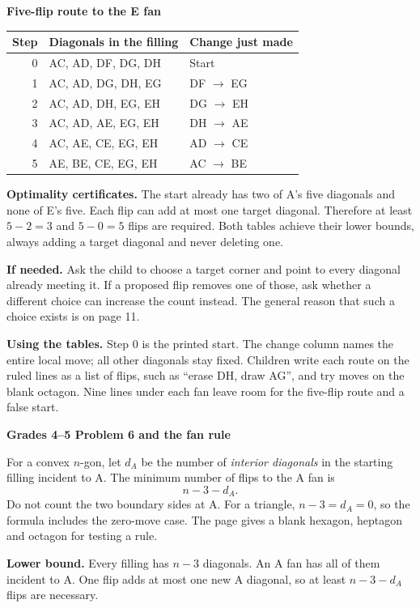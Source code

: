 \documentclass[11pt,letterpaper]{article}
\newcommand{\pagehead}[1]{{\Large\bfseries #1}\par\vspace{3pt}}
\newcommand{\prob}[2]{\par\vspace{5pt}{\large\bfseries #1}\par #2}
\newcommand{\hint}[1]{\par\textbf{If needed.} #1\par}
\begin{document}
\textbf{Five-flip route to the E fan}
\begin{center}\begin{tabular}{rll}\toprule Step & Diagonals in the filling & Change just made\\\midrule
0 & AC, AD, DF, DG, DH & Start\\
1 & AC, AD, DG, DH, EG & DF $\to$ EG\\
2 & AC, AD, DH, EG, EH & DG $\to$ EH\\
3 & AC, AD, AE, EG, EH & DH $\to$ AE\\
4 & AC, AE, CE, EG, EH & AD $\to$ CE\\
5 & AE, BE, CE, EG, EH & AC $\to$ BE\\
\bottomrule\end{tabular}\end{center}

\textbf{Optimality certificates.} The start already has two of A's five diagonals and none of E's five. Each flip can add at most one target diagonal. Therefore at least $5-2=3$ and $5-0=5$ flips are required. Both tables achieve their lower bounds, always adding a target diagonal and never deleting one.
\hint{Ask the child to choose a target corner and point to every diagonal already meeting it. If a proposed flip removes one of those, ask whether a different choice can increase the count instead. The general reason that such a choice exists is on page 11.}
\textbf{Using the tables.} Step 0 is the printed start. The change column names the entire local move; all other diagonals stay fixed. Children write each route on the ruled lines as a list of flips, such as ``erase DH, draw AG'', and try moves on the blank octagon. Nine lines under each fan leave room for the five-flip route and a false start.

\newpage
\pagehead{Grades 4--5 Problem 6 and the fan rule}
\prob{Problem 6}{For a convex $n$-gon, let $d_A$ be the number of \emph{interior diagonals} in the starting filling incident to A. The minimum number of flips to the A fan is}
\[
\boxed{n-3-d_A}.
\]
Do not count the two boundary sides at A. For a triangle, $n-3=d_A=0$, so the formula includes the zero-move case. The page gives a blank hexagon, heptagon and octagon for testing a rule.

\textbf{Lower bound.} Every filling has $n-3$ diagonals. An A fan has all of them incident to A. One flip adds at most one new A diagonal, so at least $n-3-d_A$ flips are necessary.
\end{document}
